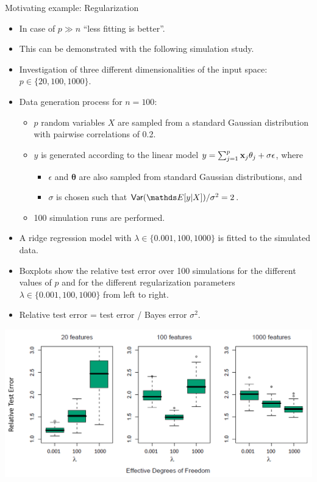 \documentclass[11pt,compress,t,notes=noshow, xcolor=table]{beamer}
\begin{document}
  \begin{vbframe}{Motivating example: Regularization}
  \begin{itemize}
    \item In case of $p \gg n$ \enquote{less fitting is better}.
    \item This can be demonstrated with the following simulation study.
    \item Investigation of three different dimensionalities of the input space: $p \in \{ 20, 100, 1000 \}$.
    \item Data generation process for $n = 100$:
    \begin{itemize}
      \item $p$ random variables $X$ are sampled from a standard Gaussian distribution with pairwise correlations of 0.2.
      \item $y$ is generated according to the linear model
    $ y = \sum_{j=1}^p \mathbf{x}_j \theta_j + \sigma\epsilon $, where
      \begin{itemize}
        \item $\epsilon$ and $\bm{\theta}$ are also sampled from standard Gaussian distributions, and
        \item $\sigma$ is chosen such that $\var (\E[y|X]) / \sigma^2 = 2$.
      \end{itemize}
    \item 100 simulation runs are performed.
    \end{itemize}
    \item A ridge regression model with $\lambda \in \{ 0.001, 100, 1000 \}$ is fitted to the simulated data.
  \end{itemize}
  
  \framebreak
  
  \begin{itemize}
  \small
    \item Boxplots show the relative test error over 100 simulations for the different values of $p$ and for the different regularization parameters $\lambda \in \{ 0.001, 100, 1000 \}$ from left to right.
    \item Relative test error = test error / Bayes error $\sigma^2$.
  \normalsize
  \end{itemize}
  \begin{center}
  \includegraphics{figure_man/tibshirani_fig_18_1_mod.png}
  \end{center}
  

\end{vbframe}
\end{document}
